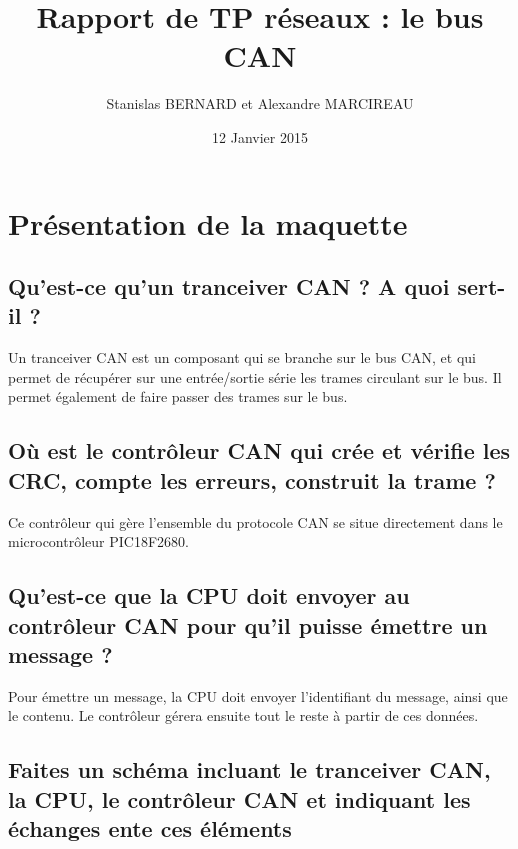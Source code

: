 \documentclass[12pt]{article}
\title{Rapport de TP réseaux : le bus CAN}
\author{Stanislas BERNARD et Alexandre MARCIREAU}
\date{12 Janvier 2015}
\begin{document}
\setlength{\unitlength}{1cm}

\maketitle

\section{Présentation de la maquette}

\subsection{Qu'est-ce qu'un tranceiver CAN ? A quoi sert-il ?}

Un tranceiver CAN est un composant qui se branche sur le bus CAN, et qui permet de récupérer sur une entrée/sortie série les trames circulant sur le bus. Il permet également de faire passer des trames sur le bus.

\subsection{Où est le contrôleur CAN qui crée et vérifie les CRC, compte les erreurs, construit la trame ?}

Ce contrôleur qui gère l'ensemble du protocole CAN se situe directement dans le microcontrôleur PIC18F2680.

\subsection{Qu'est-ce que la CPU doit envoyer au contrôleur CAN pour qu'il puisse émettre un message ?}

Pour émettre un message, la CPU doit envoyer l'identifiant du message, ainsi que le contenu. Le contrôleur gérera ensuite tout le reste à partir de ces données.

\subsection{Faites un schéma incluant le tranceiver CAN, la CPU, le contrôleur CAN et indiquant les échanges ente ces éléments}
\end{document}
